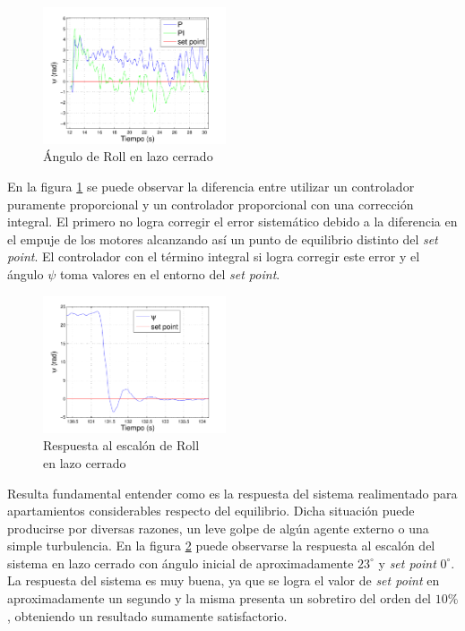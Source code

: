 \documentclass[main]{subfiles}
\begin{document}
\begin{figure}
	\centering
	\includegraphics[width=0.48\textwidth]{./pics_test_control/psi_sin_con_int.pdf}
	\caption{\'Angulo de Roll en lazo cerrado}
	\label{fig:psi_sin_con_int}
\end{figure}

En la figura \ref{fig:psi_sin_con_int} se puede observar la diferencia entre utilizar un controlador puramente proporcional y un controlador proporcional con una correcci\'on integral. El primero no logra corregir el error sistem\'atico debido a la diferencia en el empuje de los motores alcanzando as\'i un punto de equilibrio distinto del \emph{set point}. El controlador con el t\'ermino integral si logra corregir este error y el \'angulo $\psi$ toma valores en el entorno del \emph{set point}.\\


\begin{figure}
	\vspace{-10pt}
	\centering
	\includegraphics[width=0.48\textwidth]{./pics_test_control/psi_esc.pdf}
	\caption{Respuesta al escal\'on de Roll\\ en lazo cerrado}
	\label{fig:psi_esc}
\end{figure}

Resulta fundamental entender como es la respuesta del sistema realimentado para apartamientos considerables respecto del equilibrio. Dicha situaci\'on puede producirse por diversas razones, un leve golpe de alg\'un agente externo o una simple turbulencia. En la figura \ref{fig:psi_esc} puede observarse la respuesta al escal\'on del sistema en lazo cerrado	con \'angulo inicial de aproximadamente $23 ^\circ$ y \emph{set point} $0 ^\circ$. La respuesta del sistema es muy buena, ya que se logra el valor de \emph{set point} en aproximadamente un segundo y la misma presenta un sobretiro del orden del $10\%$, obteniendo un resultado sumamente satisfactorio.\\
\end{document}
